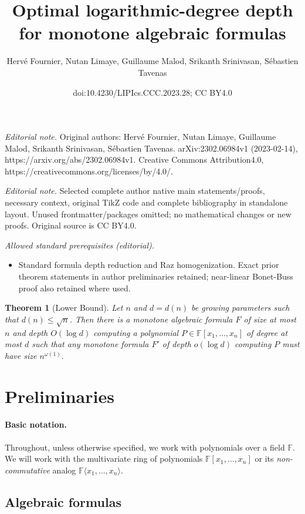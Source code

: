 \documentclass[10pt,a4paper]{article}
\title{Optimal logarithmic-degree depth for monotone algebraic formulas}
\author{Hervé Fournier, Nutan Limaye, Guillaume Malod, Srikanth Srinivasan, Sébastien Tavenas}
\date{doi:10.4230/LIPIcs.CCC.2023.28; CC BY4.0}
\newtheorem{theorem}{Theorem}
\newcommand{\F}{\mathbb{F}}
\begin{document}
\maketitle
\noindent\textit{Editorial note.} Original authors: Hervé Fournier, Nutan Limaye, Guillaume Malod, Srikanth Srinivasan, Sébastien Tavenas. arXiv:2302.06984v1 (2023-02-14), https://arxiv.org/abs/2302.06984v1. Creative Commons Attribution4.0, https://creativecommons.org/licenses/by/4.0/.\par\medskip
\noindent\textit{Editorial note.} Selected complete author native main statements/proofs, necessary context, original TikZ code and complete bibliography in standalone layout. Unused frontmatter/packages omitted; no mathematical changes or new proofs. Original source is CC BY4.0.\par\medskip
\noindent\textit{Allowed standard prerequisites (editorial).}\begin{itemize}
\item Standard formula depth reduction and Raz homogenization. Exact prior theorem statements in author preliminaries retained; near-linear Bonet-Buss proof also retained where used.
\end{itemize}\medskip
\begin{theorem}[Lower Bound]
\label{thm:lowerbound-intro}
Let $n$ and $d = d(n)$ be growing parameters such that $d(n)\leq \sqrt{n}$. Then there is a monotone algebraic formula $F$ of size at most $n$ and depth $O(\log d)$ computing a polynomial $P\in \F[x_1,\ldots,x_n]$ of degree at most $d$ such that any monotone formula $F'$ of depth $o(\log d)$ computing $P$ must have size $n^{\omega(1)}.$
\end{theorem}

\section{Preliminaries}
\label{sec:prelims}

\paragraph{Basic notation.} Throughout, unless otherwise specified, we work with polynomials over a field $\F$. We will work with the multivariate ring of polynomials $\F[x_1,\ldots,x_n]$ or its \emph{non-commutative} analog $\F\langle  x_1,\ldots,x_n \rangle.$ 

\subsection{Algebraic formulas} 
\label{sec:formula-prelims}
\end{document}
